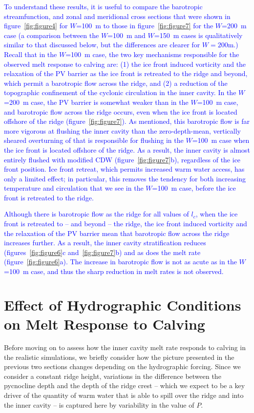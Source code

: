\documentclass[draft]{agujournal2019}
\begin{document}
\textcolor{blue}{To understand these results, it is useful to compare the barotropic streamfunction, and zonal and meridional cross sections that were shown in figure~\ref{fig:figure4} for $W$=100~m to those in figure~\ref{fig:figure7} for the $W$=200~m case (a comparison between the $W$=100~m and $W$=150~m cases is qualitatively similar to that discussed below, but the differences are clearer for $W = 200$m.) Recall that in the $W$=100~m case, the two key mechanisms responsible for the observed melt response to calving are: (1) the ice front induced vorticity and the relaxation of the PV barrier as the ice front is retreated to the ridge and beyond, which permit a barotropic flow across the ridge, and (2) a reduction of the topographic confinement of the cyclonic circulation in the inner cavity. In the $W$=200~m case, the PV barrier is somewhat weaker than in the $W$=100~m case, and barotropic flow across the ridge occurs, even when the ice front is located offshore of the ridge (figure~\ref{fig:figure7}). As mentioned, this barotropic flow is far more vigorous at flushing the inner cavity than the zero-depth-mean, vertically sheared overturning of that is responsible for flushing in the $W$=100~m case when the ice front is located offshore of the ridge. As a result, the inner cavity is almost entirely flushed with modified CDW (figure~\ref{fig:figure7}b), regardless of the ice front position. Ice front retreat, which permits increased warm water access, has only a limited effect; in particular, this removes the tendency for both increasing temperature and circulation that we see in the $W$=100~m case, before the ice front is retreated to the ridge.}

\textcolor{blue}{Although there is barotropic flow as the ridge for all values of $l_c$, when the ice front is retreated to -- and beyond -- the ridge, the ice front induced vorticity and the relaxation of the PV barrier mean that barotropic flow across the ridge increases further. As a result, the inner cavity stratification reduces (figures~\ref{fig:figure6}c and~\ref{fig:figure7}b) and as does the melt rate (figure~\ref{fig:figure6}a). The increase in barotropic flow is not as acute as in the $W$=100~m case, and  thus the sharp reduction in melt rates is not observed.}



\section{Effect of Hydrographic Conditions on Melt Response to Calving}\label{S:Results:P}
Before moving on to assess how the inner cavity melt rate responds to calving in the realistic simulations, we briefly consider how the picture presented in the previous two sections changes depending on the hydrographic forcing. Since we consider a constant ridge height, variations in the difference between the pycnocline depth and the depth of the ridge crest -- which we expect to be a key driver of the quantity of warm water that is able to spill over the ridge and into the inner cavity -- is captured here by variability in the value of $P$.
\end{document}
